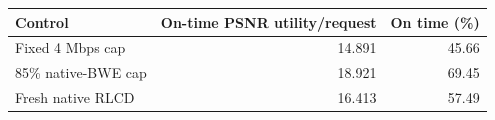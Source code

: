 \begin{tabular}{lrr}
\toprule
Control & On-time PSNR utility/request & On time (\%)\\
\midrule
Fixed 4 Mbps cap & 14.891 & 45.66 \\
85\% native-BWE cap & 18.921 & 69.45 \\
Fresh native RLCD & 16.413 & 57.49 \\
\bottomrule
\end{tabular}
